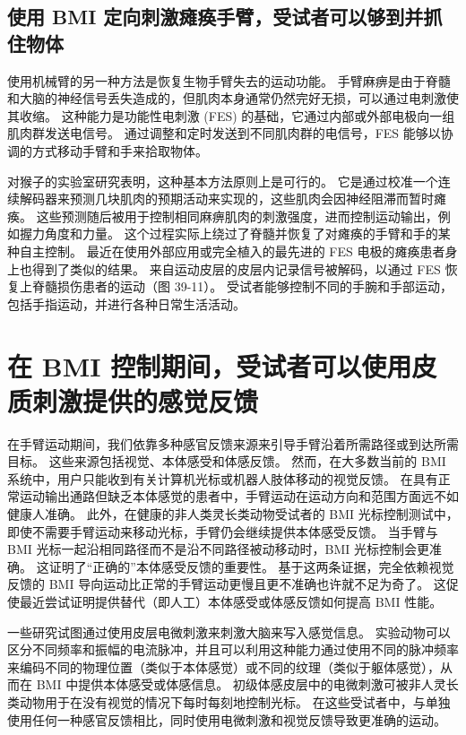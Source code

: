 \subsection{使用 BMI 定向刺激瘫痪手臂，受试者可以够到并抓住物体}

使用机械臂的另一种方法是恢复生物手臂失去的运动功能。 
手臂麻痹是由于脊髓和大脑的神经信号丢失造成的，但肌肉本身通常仍然完好无损，可以通过电刺激使其收缩。 
这种能力是功能性电刺激 (FES) 的基础，它通过内部或外部电极向一组肌肉群发送电信号。
通过调整和定时发送到不同肌肉群的电信号，FES 能够以协调的方式移动手臂和手来拾取物体。


对猴子的实验室研究表明，这种基本方法原则上是可行的。 
它是通过校准一个连续解码器来预测几块肌肉的预期活动来实现的，这些肌肉会因神经阻滞而暂时瘫痪。 
这些预测随后被用于控制相同麻痹肌肉的刺激强度，进而控制运动输出，例如握力角度和力量。 
这个过程实际上绕过了脊髓并恢复了对瘫痪的手臂和手的某种自主控制。 
最近在使用外部应用或完全植入的最先进的 FES 电极的瘫痪患者身上也得到了类似的结果。 
来自运动皮层的皮层内记录信号被解码，以通过 FES 恢复上脊髓损伤患者的运动（图 39-11）。 
受试者能够控制不同的手腕和手部运动，包括手指运动，并进行各种日常生活活动。


\section{在 BMI 控制期间，受试者可以使用皮质刺激提供的感觉反馈}

在手臂运动期间，我们依靠多种感官反馈来源来引导手臂沿着所需路径或到达所需目标。
这些来源包括视觉、本体感受和体感反馈。
然而，在大多数当前的 BMI 系统中，用户只能收到有关计算机光标或机器人肢体移动的视觉反馈。
在具有正常运动输出通路但缺乏本体感觉的患者中，手臂运动在运动方向和范围方面远不如健康人准确。
此外，在健康的非人类灵长类动物受试者的 BMI 光标控制测试中，即使不需要手臂运动来移动光标，手臂仍会继续提供本体感受反馈。
当手臂与 BMI 光标一起沿相同路径而不是沿不同路径被动移动时，BMI 光标控制会更准确。
这证明了“正确的”本体感受反馈的重要性。 
基于这两条证据，完全依赖视觉反馈的 BMI 导向运动比正常的手臂运动更慢且更不准确也许就不足为奇了。
这促使最近尝试证明提供替代（即人工）本体感受或体感反馈如何提高 BMI 性能。


一些研究试图通过使用皮层电微刺激来刺激大脑来写入感觉信息。
实验动物可以区分不同频率和振幅的电流脉冲，并且可以利用这种能力通过使用不同的脉冲频率来编码不同的物理位置（类似于本体感觉）或不同的纹理（类似于躯体感觉），从而在 BMI 中提供本体感受或体感信息。
初级体感皮层中的电微刺激可被非人灵长类动物用于在没有视觉的情况下每时每刻地控制光标。 
在这些受试者中，与单独使用任何一种感官反馈相比，同时使用电微刺激和视觉反馈导致更准确的运动。



